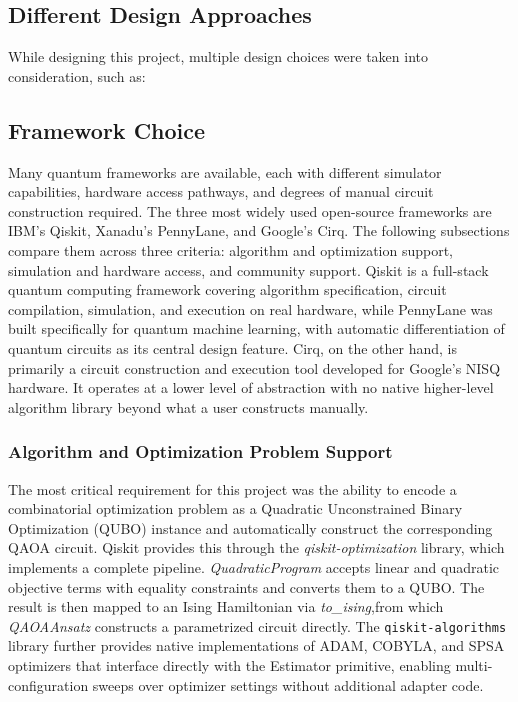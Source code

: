\documentclass[a4paper]{report}
\begin{document}
{\begin{itemize}
\section{Different Design Approaches} 
While designing this project, multiple design choices were taken into consideration, such as: 

\subsection{Framework Choice}
Many quantum frameworks are available, each with different simulator capabilities, hardware access pathways, and degrees of manual circuit construction required. The three most widely used open-source frameworks are IBM's Qiskit, Xanadu's PennyLane, and Google's Cirq. The following subsections compare them across three criteria: algorithm and optimization support, simulation and hardware access, and community support.
Qiskit is a full-stack quantum computing framework covering algorithm specification, circuit compilation, simulation, and execution on real hardware, while PennyLane was built specifically for quantum machine learning, with automatic differentiation of quantum circuits as its central design feature. Cirq, on the other hand, is primarily a circuit construction and execution tool developed for Google's NISQ hardware. It operates at a lower level of abstraction with no native higher-level algorithm library beyond what a user constructs manually.
\subsubsection{Algorithm and Optimization Problem Support}
The most critical requirement for this project was the ability to encode a combinatorial optimization problem as a Quadratic Unconstrained Binary Optimization (QUBO) instance and automatically construct the corresponding QAOA circuit. Qiskit provides this through the \textit{qiskit-optimization} library, which implements a complete pipeline. \textit{QuadraticProgram} accepts linear and quadratic objective terms with equality constraints and converts them to a QUBO. The result is then mapped to an Ising Hamiltonian via  \textit{to\_ising},from which \textit{QAOAAnsatz} constructs a parametrized circuit directly. The \texttt{qiskit-algorithms} library further provides native implementations of ADAM, COBYLA, and SPSA optimizers that interface directly with the Estimator primitive, enabling multi-configuration sweeps over optimizer settings without additional adapter code.


\end{itemize}}
\end{document}
